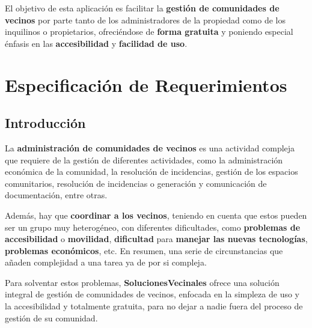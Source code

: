 El objetivo de esta aplicación es facilitar la \textbf{gestión de comunidades de vecinos} por parte tanto de los administradores de la propiedad como de los inquilinos o propietarios, ofreciéndose de \textbf{forma gratuita} y poniendo especial énfasis en las \textbf{accesibilidad} y \textbf{facilidad de uso}.



\section{Especificación de Requerimientos}

\subsection{Introducción}
La \textbf{administración de comunidades de vecinos} es una actividad compleja que requiere de la gestión de diferentes actividades, como la administración económica de la comunidad, la resolución de incidencias, gestión de los espacios comunitarios, resolución de incidencias o generación y comunicación de documentación, entre otras. 

Además, hay que \textbf{coordinar a los vecinos}, teniendo en cuenta que estos pueden ser un grupo muy heterogéneo, con diferentes dificultades, como \textbf{problemas de accesibilidad} o \textbf{movilidad}, \textbf{dificultad} para \textbf{manejar las nuevas tecnologías}, \textbf{problemas económicos}, etc. En resumen, una serie de circunstancias que añaden complejidad a una tarea ya de por si compleja.

Para solventar estos problemas, \textbf{SolucionesVecinales} ofrece una solución integral de gestión de comunidades de vecinos, enfocada en la simpleza de uso y la accesibilidad y totalmente gratuita, para no dejar a nadie fuera del proceso de gestión de su comunidad.





%

